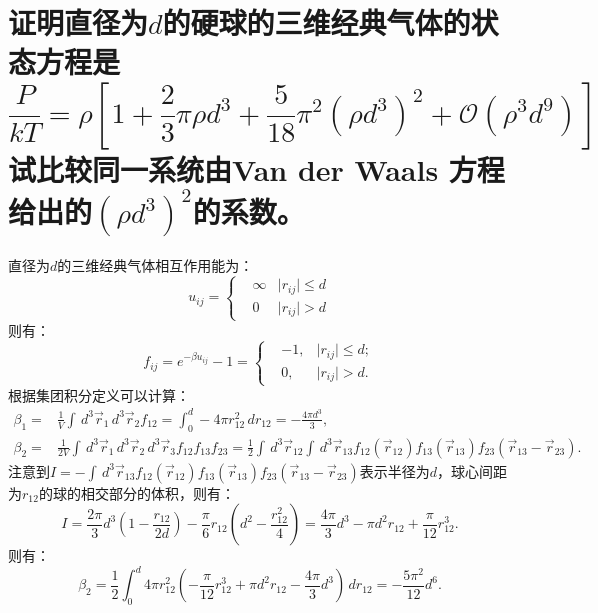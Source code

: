 \documentclass[reqno,a4paper,12pt]{amsart}
\begin{document}
\section{证明直径为$d$的硬球的三维经典气体的状态方程是
\[
	\frac{P}{kT} = \rho \left[ 1 + \frac{2}{3}\pi \rho d^3 + \frac{5}{18}\pi^2(\rho d^3)^2 + \mathcal{O}(\rho^3d^9) \right]
\]
试比较同一系统由Van der Waals 方程给出的$(\rho d^3)^2$的系数。
}
\begin{tcolorbox}[breakable, colback = black!5!white, colframe = black]
直径为$d$的三维经典气体相互作用能为：
\[
	u_{ij} = \left\{\begin{aligned}
		&\infty &\vert r_{ij} \vert\leq d \\
		&0 &\vert r_{ij} \vert > d
	\end{aligned}\right.
\]
则有：
\[
	f_{ij} = e^{-\beta u_{ij}} - 1 = \left\{ \begin{aligned}
		&-1, & \vert r_{ij} \vert \leq d; \\
		&0, & \vert r_{ij} \vert > d.
	\end{aligned}\right.
\]
根据集团积分定义可以计算：
\begin{align*}
	\beta_1 =& \frac{1}{V} \int \,d^3\vec{r}_1\,d^3\vec{r}_2 f_{12} = \int_0^d -4\pi r_{12}^2\,dr_{12} = -\frac{4\pi d^3}{3}, \\
	\beta_2 =& \frac{1}{2V} \int \,d^3\vec{r}_1 \,d^3\vec{r}_2 \,d^3\vec{r}_3 f_{12}f_{13}f_{23} = \frac{1}{2} \int \,d^3\vec{r}_{12} \int \,d^3\vec{r}_{13} f_{12}(\vec{r}_{12}) f_{13}(\vec{r}_{13}) f_{23}(\vec{r}_{13} - \vec{r}_{23}).
\end{align*}
注意到$I = -\int \,d^3\vec{r}_{13} f_{12}(\vec{r}_{12}) f_{13}(\vec{r}_{13}) f_{23}(\vec{r}_{13} - \vec{r}_{23})$表示半径为$d$，球心间距为$r_{12}$的球的相交部分的体积，则有：
\[
	I = \frac{2\pi}{3}d^3\left( 1-\frac{r_{12}}{2d} \right) - \frac{\pi}{6}r_{12} \left( d^2 - \frac{r_{12}^2}{4} \right) = \frac{4\pi}{3}d^3 - \pi d^2r_{12} + \frac{\pi}{12} r_{12}^3.
\]
则有：
\[
	\beta_2 = \frac{1}{2}\int_0^d 4\pi r_{12}^2\left( -\frac{\pi}{12}r_{12}^3 + \pi d^2r_{12} - \frac{4\pi}{3}d^3 \right)\,dr_{12} = -\frac{5\pi^2}{12}d^6.
\]

\end{tcolorbox}
\end{document}
